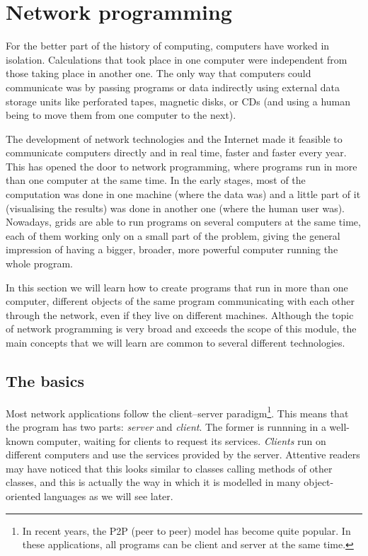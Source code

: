 \section{Network programming}
\label{sec:network-programming}

For the better part of the history of computing, computers have worked
in isolation. Calculations that took place in one computer were
independent from those taking place in another one. The only way that
computers could communicate was by passing programs or data 
indirectly using external data storage units
like perforated tapes, magnetic disks, or CDs (and using a human being
to move them from one computer to the next). 

The development of network technologies and the Internet made it
feasible to communicate computers directly and in real time, faster
and faster every year. This has opened the door to network
programming, where programs run in more than one computer at the same
time. In the early stages, most of the computation was done in one
machine (where the data was) and a little part of it (visualising the
results) was done in another one (where the human user was). Nowadays,
grids are 
able to run programs on several computers at the same time, each of
them working only on a small part of 
the problem, giving the general impression
of having a bigger, broader, more powerful computer running the whole
program. 

In this section we will learn how to create programs that run in more
than one computer, different objects of the same program communicating
with each other through the network, even if they live on different
machines. Although the topic of network programming is very broad and
exceeds the scope of this module, the main concepts that we
will learn are common to several different technologies. 

\subsection{The basics}
\label{sec:basics}

Most network applications follow the client--server
paradigm\footnote{In recent years, the P2P (peer to peer) model has
  become quite popular. In these applications, all programs can be client
  and server at the same time.}. This means that the program has two 
parts: \emph{server} and \emph{client}. The former is
runnning in a well-known computer, waiting for clients to request its
services.  \emph{Clients} run on different computers and use the
services provided by the server. Attentive readers may have noticed
that this looks similar to classes calling methods of other classes,
and this is actually the way in which it is modelled in many
object-oriented languages as we will see later.

